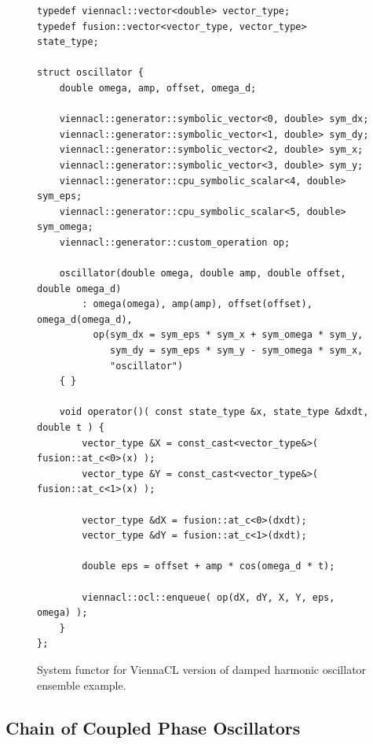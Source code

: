 \documentclass[1p]{elsarticle}
\begin{document}
\begin{figure}[p]
\begin{lstlisting}
typedef viennacl::vector<double> vector_type;
typedef fusion::vector<vector_type, vector_type> state_type;

struct oscillator {
    double omega, amp, offset, omega_d;

    viennacl::generator::symbolic_vector<0, double> sym_dx;
    viennacl::generator::symbolic_vector<1, double> sym_dy;
    viennacl::generator::symbolic_vector<2, double> sym_x;
    viennacl::generator::symbolic_vector<3, double> sym_y;
    viennacl::generator::cpu_symbolic_scalar<4, double> sym_eps;
    viennacl::generator::cpu_symbolic_scalar<5, double> sym_omega;
    viennacl::generator::custom_operation op;

    oscillator(double omega, double amp, double offset, double omega_d)
        : omega(omega), amp(amp), offset(offset), omega_d(omega_d),
          op(sym_dx = sym_eps * sym_x + sym_omega * sym_y,
             sym_dy = sym_eps * sym_y - sym_omega * sym_x,
             "oscillator")
    { }

    void operator()( const state_type &x, state_type &dxdt, double t ) {
        vector_type &X = const_cast<vector_type&>( fusion::at_c<0>(x) );
        vector_type &Y = const_cast<vector_type&>( fusion::at_c<1>(x) );

        vector_type &dX = fusion::at_c<0>(dxdt);
        vector_type &dY = fusion::at_c<1>(dxdt);

        double eps = offset + amp * cos(omega_d * t);

        viennacl::ocl::enqueue( op(dX, dY, X, Y, eps, omega) );
    }
};
\end{lstlisting}
\caption{System functor for ViennaCL version of damped harmonic oscillator
ensemble example.}
\label{code:viennacl:damped}
\end{figure}





%
%
\subsection{Chain of Coupled Phase Oscillators}
\end{document}
